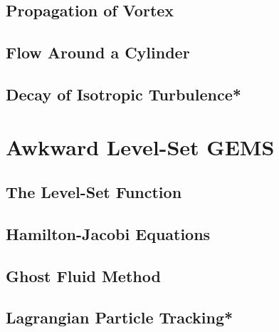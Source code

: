 \documentclass[11pt, letterpaper]{report}
\begin{document}
\section{Propagation of Vortex}

\section{Flow Around a Cylinder}

\section{Decay of Isotropic Turbulence*}

\chapter{Awkward Level-Set GEMS}

\section{The Level-Set Function}

\section{Hamilton-Jacobi Equations}

\section{Ghost Fluid Method}

\section{Lagrangian Particle Tracking*}











\clearpage


\end{document}
